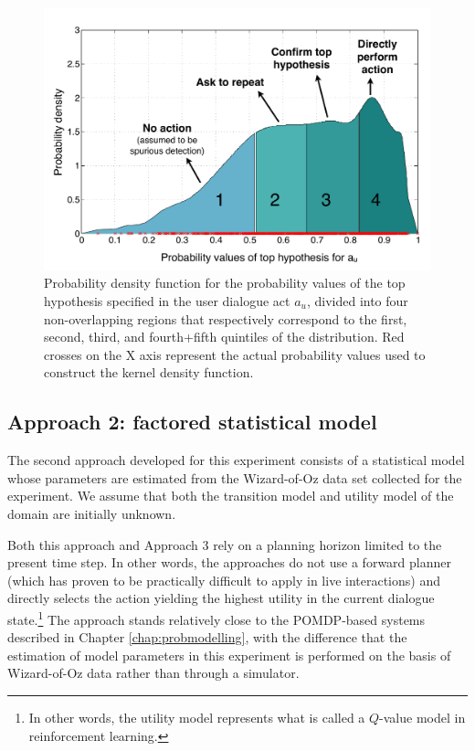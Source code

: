 \begin{figure}[h!]
\centering
\includegraphics[scale=0.45]{imgs/asrconfidence.pdf} 
\caption{Probability density function for the probability values of the top hypothesis specified in the user dialogue act $a_u$, divided into four non-overlapping regions that respectively correspond to the first, second, third, and fourth+fifth quintiles of the distribution. Red crosses on the X axis represent the actual probability values used to construct the kernel density function.}
\label{fig:asrconfidence-exp3}
\end{figure}


\subsection{Approach 2: factored statistical model}
\label{sec:approach2}

The second approach developed for this experiment consists of a statistical model whose parameters are estimated from the Wizard-of-Oz data set collected for the experiment. We assume that both the transition model and utility model of the domain are initially unknown. 

Both this approach and Approach 3 rely on a planning horizon limited to the present time step.  In other words, the approaches do not use a forward planner (which has proven to be practically difficult to apply in live interactions) and directly selects the action yielding the highest utility in the current dialogue state.\footnote{In other words, the utility model represents what is called a $Q$-value model in reinforcement learning.} The approach stands relatively close to the POMDP-based systems described in Chapter \ref{chap:probmodelling}, with the difference that the estimation of model parameters in this experiment is performed on the basis of Wizard-of-Oz data rather than through a  simulator. 

